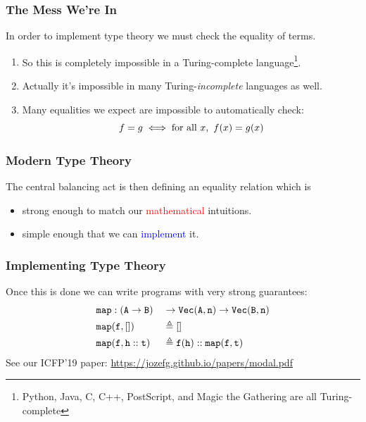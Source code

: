 \documentclass[usenames,dvipsnames,aspectratio=169,12pt]{beamer}
\begin{document}
\begin{frame}
  \frametitle{The Mess We're In}
  In order to implement type theory we must check the equality of terms.
  \begin{enumerate}
  \item So this is completely impossible in a Turing-complete language\footnote{Python, Java, C,
      C++, PostScript, and Magic the Gathering are all Turing-complete}.
  \item Actually it's impossible in many Turing-\emph{incomplete} languages as well.
  \item Many equalities we expect are impossible to automatically check:
    \[
      f = g \iff \text{for all } x,\ f(x) = g(x)
    \]
  \end{enumerate}
\end{frame}

\begin{frame}
  \frametitle{Modern Type Theory}
  The central balancing act is then defining an equality relation which is
  \begin{itemize}
  \item strong enough to match our \textcolor{Red}{mathematical} intuitions.
  \item simple enough that we can \textcolor{Blue}{implement} it.
  \end{itemize}
\end{frame}

\begin{frame}
  \frametitle{Implementing Type Theory}
  Once this is done we can write programs with very strong guarantees:
  \begin{alignat*}{2}
    &\mathtt{map} : (\mathtt{A} \to \mathtt{B}) &&\to \mathtt{Vec}(\mathtt{A}, \mathtt{n}) \to \mathtt{Vec}(\mathtt{B}, \mathtt{n})\\
    &\mathtt{map}(\mathtt{f}, []) &&\triangleq []\\
    &\mathtt{map}(\mathtt{f}, \mathtt{h} :: \mathtt{t}) &&\triangleq \mathtt{f}(\mathtt{h}) :: \mathtt{map}(\mathtt{f}, \mathtt{t})
  \end{alignat*}
  See our ICFP'19 paper: \url{https://jozefg.github.io/papers/modal.pdf}
\end{frame}


\end{document}
